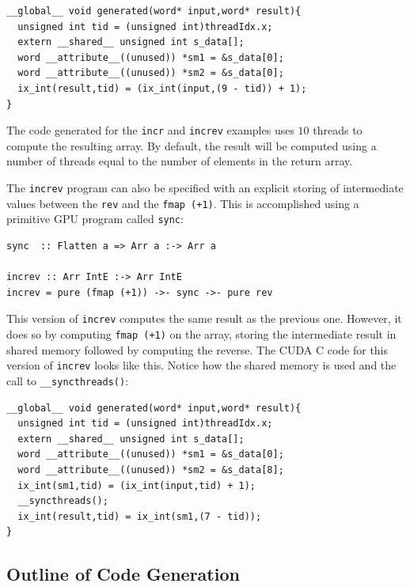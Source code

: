 \begin{small}
\begin{verbatim}
__global__ void generated(word* input,word* result){
  unsigned int tid = (unsigned int)threadIdx.x;
  extern __shared__ unsigned int s_data[];
  word __attribute__((unused)) *sm1 = &s_data[0];
  word __attribute__((unused)) *sm2 = &s_data[0];
  ix_int(result,tid) = (ix_int(input,(9 - tid)) + 1);
}
\end{verbatim}
\end{small}
\noindent
The code generated for the {\tt incr} and {\tt increv} examples uses 
$10$ threads to compute the resulting array. By default, the result will 
be computed using a number of threads equal to the number of elements in 
the return array. 

The {\tt increv} program can also be specified with an explicit storing 
of intermediate values between the {\tt rev} and the {\tt fmap (+1)}. 
This is accomplished using a primitive GPU program called {\tt sync}:

\begin{small}
\begin{verbatim}
sync  :: Flatten a => Arr a :-> Arr a

increv :: Arr IntE :-> Arr IntE 
increv = pure (fmap (+1)) ->- sync ->- pure rev
\end{verbatim}
\end{small} 
\noindent
This version of {\tt increv} computes the same result as the previous one. 
However, it does so by computing {\tt fmap (+1)} on the array, storing the
intermediate result in shared memory followed by computing the reverse.
The CUDA C code for this version of {\tt increv} looks like this. Notice 
how the shared memory is used and the call to {\tt \_\_syncthreads()}: 
%
\begin{small}
\begin{verbatim}
__global__ void generated(word* input,word* result){
  unsigned int tid = (unsigned int)threadIdx.x;
  extern __shared__ unsigned int s_data[];
  word __attribute__((unused)) *sm1 = &s_data[0];
  word __attribute__((unused)) *sm2 = &s_data[8];
  ix_int(sm1,tid) = (ix_int(input,tid) + 1);
  __syncthreads();
  ix_int(result,tid) = ix_int(sm1,(7 - tid));
}
\end{verbatim}
\end{small}


\subsection{Outline of Code Generation}
\label{sec:CodeGen}
\FloatBarrier


